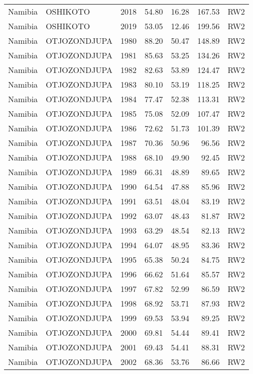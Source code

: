 \begin{longtable}{lllrrrl}
  Namibia & OSHIKOTO & 2018 & 54.80 & 16.28 & 167.53 & RW2 \\ 
  Namibia & OSHIKOTO & 2019 & 53.05 & 12.46 & 199.56 & RW2 \\ 
  Namibia & OTJOZONDJUPA & 1980 & 88.20 & 50.47 & 148.89 & RW2 \\ 
  Namibia & OTJOZONDJUPA & 1981 & 85.63 & 53.25 & 134.26 & RW2 \\ 
  Namibia & OTJOZONDJUPA & 1982 & 82.63 & 53.89 & 124.47 & RW2 \\ 
  Namibia & OTJOZONDJUPA & 1983 & 80.10 & 53.19 & 118.25 & RW2 \\ 
  Namibia & OTJOZONDJUPA & 1984 & 77.47 & 52.38 & 113.31 & RW2 \\ 
  Namibia & OTJOZONDJUPA & 1985 & 75.08 & 52.09 & 107.47 & RW2 \\ 
  Namibia & OTJOZONDJUPA & 1986 & 72.62 & 51.73 & 101.39 & RW2 \\ 
  Namibia & OTJOZONDJUPA & 1987 & 70.36 & 50.96 & 96.56 & RW2 \\ 
  Namibia & OTJOZONDJUPA & 1988 & 68.10 & 49.90 & 92.45 & RW2 \\ 
  Namibia & OTJOZONDJUPA & 1989 & 66.31 & 48.89 & 89.65 & RW2 \\ 
  Namibia & OTJOZONDJUPA & 1990 & 64.54 & 47.88 & 85.96 & RW2 \\ 
  Namibia & OTJOZONDJUPA & 1991 & 63.51 & 48.04 & 83.19 & RW2 \\ 
  Namibia & OTJOZONDJUPA & 1992 & 63.07 & 48.43 & 81.87 & RW2 \\ 
  Namibia & OTJOZONDJUPA & 1993 & 63.29 & 48.54 & 82.13 & RW2 \\ 
  Namibia & OTJOZONDJUPA & 1994 & 64.07 & 48.95 & 83.36 & RW2 \\ 
  Namibia & OTJOZONDJUPA & 1995 & 65.38 & 50.24 & 84.75 & RW2 \\ 
  Namibia & OTJOZONDJUPA & 1996 & 66.62 & 51.64 & 85.57 & RW2 \\ 
  Namibia & OTJOZONDJUPA & 1997 & 67.82 & 52.99 & 86.59 & RW2 \\ 
  Namibia & OTJOZONDJUPA & 1998 & 68.92 & 53.71 & 87.93 & RW2 \\ 
  Namibia & OTJOZONDJUPA & 1999 & 69.53 & 53.94 & 89.25 & RW2 \\ 
  Namibia & OTJOZONDJUPA & 2000 & 69.81 & 54.44 & 89.41 & RW2 \\ 
  Namibia & OTJOZONDJUPA & 2001 & 69.43 & 54.41 & 88.31 & RW2 \\ 
  Namibia & OTJOZONDJUPA & 2002 & 68.36 & 53.76 & 86.66 & RW2 \\ 

\end{longtable}
